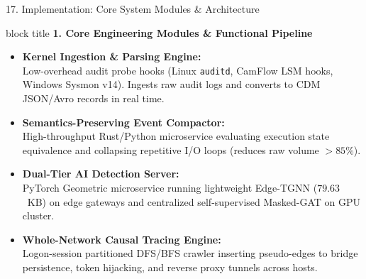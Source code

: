 \documentclass[aspectratio=169,10pt]{beamer}
\begin{document}
\begin{frame}{17. Implementation: Core System Modules \& Architecture}
\vspace{0.3em}
\begin{beamercolorbox}[rounded=true,shadow=false,sep=0.45em,wd=\textwidth]{block title}
\textbf{\scriptsize 1. Core Engineering Modules \& Functional Pipeline}
\end{beamercolorbox}
\vspace{0.3em}
{\fontsize{7.8pt}{11.5pt}\selectfont
\begin{itemize}\itemsep0.45em
  \item \textbf{Kernel Ingestion \& Parsing Engine:}\\
  Low-overhead audit probe hooks (Linux \texttt{auditd}, CamFlow LSM hooks, Windows Sysmon v14). Ingests raw audit logs and converts to CDM JSON/Avro records in real time.
  \item \textbf{Semantics-Preserving Event Compactor:}\\
  High-throughput Rust/Python microservice evaluating execution state equivalence and collapsing repetitive I/O loops (reduces raw volume $>85\%$).
  \item \textbf{Dual-Tier AI Detection Server:}\\
  PyTorch Geometric microservice running lightweight Edge-TGNN ($79.63$~KB) on edge gateways and centralized self-supervised Masked-GAT on GPU cluster.
  \item \textbf{Whole-Network Causal Tracing Engine:}\\
  Logon-session partitioned DFS/BFS crawler inserting pseudo-edges to bridge persistence, token hijacking, and reverse proxy tunnels across hosts.
\end{itemize}
}
\end{frame}
\end{document}
